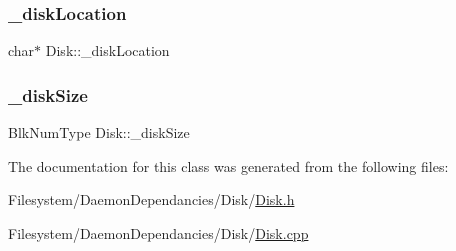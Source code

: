 \mbox{\label{class_disk_a04bd92b804d0c07e87a9277fa647c972}} 
\subsubsection{\texorpdfstring{\+\_\+disk\+Location}{\_diskLocation}}
{\footnotesize\ttfamily char$\ast$ Disk\+::\+\_\+disk\+Location\hspace{0.3cm}{\ttfamily [private]}}

\mbox{\label{class_disk_a6389ea8f99ad557d02685b292c23a656}} 
\subsubsection{\texorpdfstring{\+\_\+disk\+Size}{\_diskSize}}
{\footnotesize\ttfamily Blk\+Num\+Type Disk\+::\+\_\+disk\+Size\hspace{0.3cm}{\ttfamily [private]}}



The documentation for this class was generated from the following files\+:\begin{DoxyCompactItemize}
\item 
Filesystem/\+Daemon\+Dependancies/\+Disk/\mbox{\hyperlink{_disk_8h}{Disk.\+h}}\item 
Filesystem/\+Daemon\+Dependancies/\+Disk/\mbox{\hyperlink{_disk_8cpp}{Disk.\+cpp}}\end{DoxyCompactItemize}
